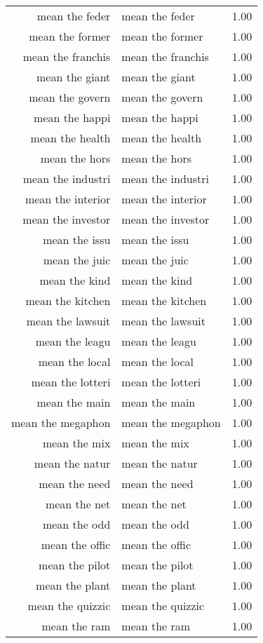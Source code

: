 \begin{table}[ht]
\begin{tabular}{rlr}
  mean the feder & mean the feder & 1.00 \\ 
  mean the former & mean the former & 1.00 \\ 
  mean the franchis & mean the franchis & 1.00 \\ 
  mean the giant & mean the giant & 1.00 \\ 
  mean the govern & mean the govern & 1.00 \\ 
  mean the happi & mean the happi & 1.00 \\ 
  mean the health & mean the health & 1.00 \\ 
  mean the hors & mean the hors & 1.00 \\ 
  mean the industri & mean the industri & 1.00 \\ 
  mean the interior & mean the interior & 1.00 \\ 
  mean the investor & mean the investor & 1.00 \\ 
  mean the issu & mean the issu & 1.00 \\ 
  mean the juic & mean the juic & 1.00 \\ 
  mean the kind & mean the kind & 1.00 \\ 
  mean the kitchen & mean the kitchen & 1.00 \\ 
  mean the lawsuit & mean the lawsuit & 1.00 \\ 
  mean the leagu & mean the leagu & 1.00 \\ 
  mean the local & mean the local & 1.00 \\ 
  mean the lotteri & mean the lotteri & 1.00 \\ 
  mean the main & mean the main & 1.00 \\ 
  mean the megaphon & mean the megaphon & 1.00 \\ 
  mean the mix & mean the mix & 1.00 \\ 
  mean the natur & mean the natur & 1.00 \\ 
  mean the need & mean the need & 1.00 \\ 
  mean the net & mean the net & 1.00 \\ 
  mean the odd & mean the odd & 1.00 \\ 
  mean the offic & mean the offic & 1.00 \\ 
  mean the pilot & mean the pilot & 1.00 \\ 
  mean the plant & mean the plant & 1.00 \\ 
  mean the quizzic & mean the quizzic & 1.00 \\ 
  mean the ram & mean the ram & 1.00 \\ 

\end{tabular}
\end{table}

